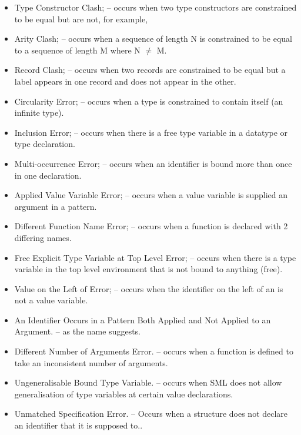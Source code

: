 \documentclass{article}
\begin{document}
\begin{itemize}

\item Type Constructor Clash; \subitem -- occurs
  when two type constructors are constrained to be equal but
  are not, for example, 
\item Arity Clash; \subitem -- occurs when a sequence of length N is
  constrained to be equal to a sequence of length M where N $\neq$ M.
\item Record Clash; \subitem -- occurs when two records are
  constrained to be equal but a label appears in one record and does
  not appear in the other.
\item Circularity Error; \subitem -- occurs when a type is
  constrained to contain itself (an infinite type).
\item Inclusion Error; \subitem -- occurs when there is a free type
  variable in a datatype or type declaration.
\item Multi-occurrence Error; \subitem -- occurs when an identifier
  is bound more than once in one declaration.
\item Applied Value Variable Error; \subitem -- occurs when a value
  variable is supplied an argument in a pattern.
\item Different Function Name Error; \subitem -- occurs when a
  function is declared with 2 differing names.
\item Free Explicit Type Variable at Top Level Error; \subitem --
  occurs when there is a type variable in the top level environment
  that is not bound to anything (free).
\item Value on the Left of  Error; \subitem --
  occurs when the identifier on the left of an  is
  not a value variable.
\item An Identifier Occurs in a Pattern Both Applied and Not Applied to
  an Argument. \subitem -- as the name suggests.
\item Different Number of Arguments Error.  \subitem -- occurs when a
  function is defined to take an inconsistent number of arguments.
\item Ungeneralisable Bound Type Variable.  \subitem -- occurs when SML does
  not allow generalisation of type variables at certain value
  declarations.
\item Unmatched Specification Error. \subitem -- Occurs when a structure does not declare an identifier that it is supposed to..
\end{itemize}
\end{document}
